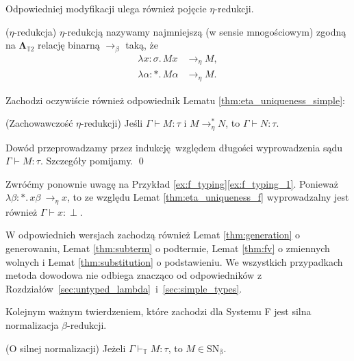 Odpowiedniej modyfikacji ulega również pojęcie \(\eta\)-redukcji.
  \begin{definicja}(\(\eta\)-redukcja)
    \(\eta\)-redukcją nazywamy najmniejszą (w sensie mnogościowym) zgodną na \(\mathbf{\Lambda}_{\mathbb{T}2}\) relację binarną \(\to_\beta\) taką, że
  \begin{align*}
    \lambda x:\sigma.\,Mx &\to_\eta M,\\
    \lambda \alpha:*.\,M\alpha &\to_\eta M.
  \end{align*}
  \end{definicja}

Zachodzi oczywiście również odpowiednik Lematu \ref{thm:eta_uniqueness_simple}:
\begin{lemat}(Zachowawczość \(\eta\)-redukcji)\label{thm:eta_uniqueness_f}
  Jeśli \(\Gamma\vdash M:\tau\) i \(M\to^{*}_\eta N\), to \(\Gamma\vdash N:\tau\).
\end{lemat}
\begin{dowod}
  Dowód przeprowadzamy przez indukcję względem długości wyprowadzenia sądu \(\Gamma\vdash M:\tau\). Szczegóły pomijamy. \qed
\end{dowod}

\begin{przyklad} Zwróćmy ponownie uwagę na Przykład \ref{ex:f_typing}\ref{ex:f_typing_1}. Ponieważ \(\lambda \beta : *.\,x\beta\ \to_\eta x\), to ze względu Lemat \ref{thm:eta_uniqueness_f} wyprowadzalny jest również \(\Gamma\vdash x:\perp\).
\end{przyklad}

W odpowiednich wersjach zachodzą również Lemat \ref{thm:generation} o generowaniu, Lemat \ref{thm:subterm} o podtermie, Lemat \ref{thm:fv} o zmiennych wolnych i Lemat \ref{thm:substitution} o podstawieniu. We wszystkich przypadkach metoda dowodowa nie odbiega znacząco od odpowiedników z Rozdziałów~\ref{sec:untyped_lambda}~i~\ref{sec:simple_types}.

Kolejnym ważnym twierdzeniem, które zachodzi dla Systemu F jest silna normalizacja \(\beta\)-redukcji.

\begin{twierdzenie}(O silnej normalizacji)
  Jeżeli \(\Gamma\vdash_\mathbb{T}M:\tau\), to \(M\in\mathrm{SN_\beta}\).
\end{twierdzenie}
\begin{dowod}

\end{dowod}


